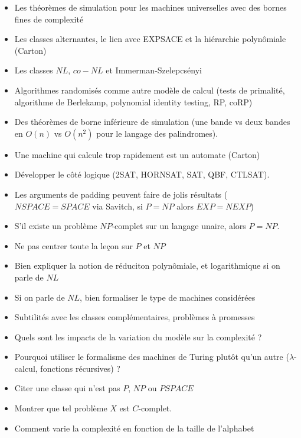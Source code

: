 \documentclass{agregfiche}
\begin{document}
\secidees

\begin{itemize}
    \item Les théorèmes de simulation pour les machines 
        universelles avec des bornes fines de complexité
    \item Les classes alternantes, le lien avec 
        EXPSACE et la hiérarchie polynômiale (Carton)
    \item Les classes $NL$, $co-NL$ et Immerman-Szelepcsényi
    \item Algorithmes randomisés comme autre modèle de calcul
        (tests de primalité, algorithme de Berlekamp,
        polynomial identity testing, RP, coRP)
    \item Des théorèmes de borne inférieure de simulation
        (une bande vs deux bandes en $O(n)$ vs $O(n^2)$ 
        pour le langage des palindromes).
    \item Une machine qui calcule trop rapidement est un automate 
        (Carton)
    \item Développer le côté logique (2SAT, HORNSAT, SAT, QBF, CTLSAT).
    \item Les arguments de padding peuvent faire de jolis résultats 
        ($NSPACE = SPACE$ via Savitch, si $P = NP$ alors $EXP = NEXP$)
    \item S'il existe un problème $NP$-complet sur un langage unaire,
        alors $P = NP$.
\end{itemize}

\secpieges

\begin{itemize}
    \item Ne pas centrer toute la leçon sur $P$ et $NP$
    \item Bien expliquer la notion de réduciton polynômiale,
        et logarithmique si on parle de $NL$
    \item Si on parle de $NL$, bien formaliser le type de machines 
        considérées
    \item Subtilités avec les classes complémentaires, problèmes à promesses
\end{itemize}


\secquestionsclassiques

\begin{itemize}
    \item Quels sont les impacts de la variation du modèle sur la complexité ?
    \item Pourquoi utiliser le formalisme des machines de Turing 
        plutôt qu'un autre ($\lambda$-calcul, fonctions récursives) ?
    \item Citer une classe qui n'est pas $P$, $NP$ ou $PSPACE$
    \item Montrer que tel problème $X$ est $C$-complet.
    \item Comment varie la complexité en fonction de la taille de l'alphabet
\end{itemize}
\end{document}
